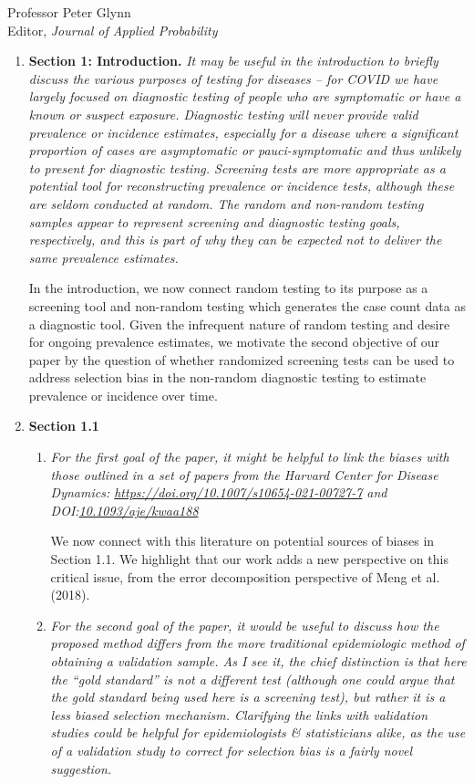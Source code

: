 \documentclass[11pt]{letter} %
\begin{document}
\begin{letter}{Professor
	Peter Glynn\\
	Editor, {\em Journal of Applied Probability}}
\begin{enumerate}
\item {\bf Section 1: Introduction.} {\it It may be useful in the introduction to briefly discuss the various purposes of testing for diseases – for COVID we have largely focused on diagnostic testing of people who are symptomatic or have a known or suspect exposure. Diagnostic testing will never provide valid prevalence or incidence estimates, especially for a disease where a significant proportion of cases are asymptomatic or pauci-symptomatic and thus unlikely to present for diagnostic testing. Screening tests are more appropriate as a potential tool for reconstructing prevalence or incidence tests, although these are seldom conducted at random. The random and non-random testing samples appear to represent screening and diagnostic testing goals, respectively, and this is part of why they can be expected not to deliver the same prevalence estimates.}

\vspace{5mm}
In the introduction, we now connect random testing to its purpose as a screening tool and non-random testing which generates the case count data as a diagnostic tool.  Given the infrequent nature of random testing and desire for ongoing prevalence estimates, we motivate the second objective of our paper by the question of whether randomized screening tests can be used to address selection bias in the non-random diagnostic testing to estimate prevalence or incidence over time.
\vspace{5mm}

\item {\bf Section 1.1}
\begin{enumerate}
	\item {\it For the first goal of the paper, it might be helpful to link the biases with those outlined in a set of papers from the Harvard Center for Disease Dynamics: \url{https://doi.org/10.1007/s10654-021-00727-7} and DOI:\url{10.1093/aje/kwaa188}}
	\vspace{5mm}

	We now connect with this literature on potential sources of biases in Section 1.1.  We highlight that our work adds a new perspective on this critical issue, from the error decomposition perspective of Meng et al. (2018).
	\vspace{5mm}

	\item {\it For the second goal of the paper, it would be useful to discuss how the proposed method differs from the more traditional epidemiologic method of obtaining a validation sample. As I see it, the chief distinction is that here the “gold standard” is not a different test (although one could argue that the gold standard being used here is a screening test), but rather it is a less biased selection mechanism. Clarifying the links with validation studies could be helpful for epidemiologists \& statisticians alike, as the use of a validation study to correct for selection bias is a fairly novel suggestion.}
	\vspace{5mm}


\end{enumerate}
\end{enumerate}
\end{letter}
\end{document}
